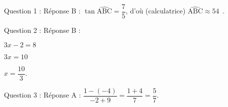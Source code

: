 
\medskip

Question 1 : Réponse B : $\tan \widehat{\text{ABC}} = \dfrac{7}{5}$, d'où (calculatrice) $\widehat{\text{ABC}} \approx 54$~\degres.

Question 2 : Réponse B : 

$3x-2 = 8$

$3x =10$

$x= \dfrac{10}{3}$.

Question 3 : Réponse A : $\dfrac{1- (- 4)}{- 2 + 9} = \dfrac{1 + 4}{7} = \dfrac{5}{7}$.

\vspace{0,5cm}


